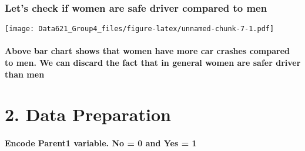 \documentclass[]{article}
\newenvironment{Shaded}{\begin{snugshade}}{\end{snugshade}}
\newcommand{\DecValTok}[1]{\textcolor[rgb]{0.00,0.00,0.81}{#1}}
\newcommand{\KeywordTok}[1]{\textcolor[rgb]{0.13,0.29,0.53}{\textbf{#1}}}
\newcommand{\NormalTok}[1]{#1}
\newcommand{\OperatorTok}[1]{\textcolor[rgb]{0.81,0.36,0.00}{\textbf{#1}}}
\newcommand{\StringTok}[1]{\textcolor[rgb]{0.31,0.60,0.02}{#1}}
\let\oldparagraph\paragraph
\renewcommand{\paragraph}[1]{\oldparagraph{#1}\mbox{}}
\begin{document}
\hypertarget{lets-check-if-women-are-safe-driver-compared-to-men}{%
\subsubsection{\texorpdfstring{\textbf{Let's check if women are safe
driver compared to
men}}{Let's check if women are safe driver compared to men}}\label{lets-check-if-women-are-safe-driver-compared-to-men}}

\texttt{[image: Data621\_Group4\_files/figure-latex/unnamed-chunk-7-1.pdf]}

\hypertarget{above-bar-chart-shows-that-women-have-more-car-crashes-compared-to-men.-we-can-discard-the-fact-that-in-general-women-are-safer-driver-than-men}{%
\paragraph{Above bar chart shows that women have more car crashes
compared to men. We can discard the fact that in general women are safer
driver than
men}\label{above-bar-chart-shows-that-women-have-more-car-crashes-compared-to-men.-we-can-discard-the-fact-that-in-general-women-are-safer-driver-than-men}}

\hypertarget{data-preparation}{%
\section{2. Data Preparation}\label{data-preparation}}

\hypertarget{encode-parent1-variable.-no-0-and-yes-1}{%
\paragraph{\texorpdfstring{\textbf{Encode Parent1 variable. No = 0 and
Yes =
1}}{Encode Parent1 variable. No = 0 and Yes = 1}}\label{encode-parent1-variable.-no-0-and-yes-1}}

\begin{Shaded}
\end{Shaded}
\end{document}
